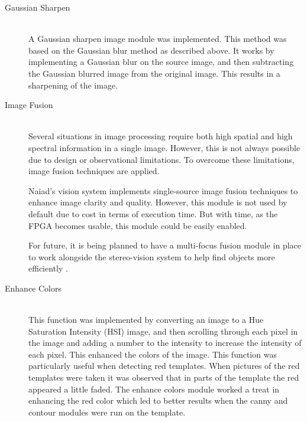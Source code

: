 \begin{description}
\item[Gaussian Sharpen]\hfill \\
A Gaussian sharpen image module was implemented. This method was based on the Gaussian blur method as described above. It works by implementing a Gaussian blur on the source image, and then subtracting the Gaussian blurred image from the original image. This results in a sharpening of the image. 

\item[Image Fusion]\hfill \\
Several situations in image processing require both high spatial and high spectral information in a single image. However, this is not always possible due to design or observational limitations.
To overcome these limitations, image fusion techniques are applied.

Naiad's vision system implements single-source image fusion techniques to enhance image clarity and quality. However, this module is not used by default due to cost in terms of execution time. But with time, as the FPGA becomes usable, this module could be easily enabled.

For future, it is being planned to have a multi-focus fusion module in place to work alongside the stereo-vision system to help find objects more efficiently \cite{article:Zheng2010} \cite{article:Zhang2010} \cite{article:Shutao}.

\item[Enhance Colors]\hfill \\
This function was implemented by converting an image to a Hue Saturation Intensity (HSI) image, and then scrolling through each pixel in the image and adding a number to the intensity to increase the intensity of each pixel. This enhanced the colors of the image. This function was particularly useful when detecting red templates. When pictures of the red templates were taken it was observed that in parts of the template the red appeared a little faded. The enhance colors module worked a treat in enhancing the red color which led to better results when the canny and contour modules were run on the template. 
\end{description}

